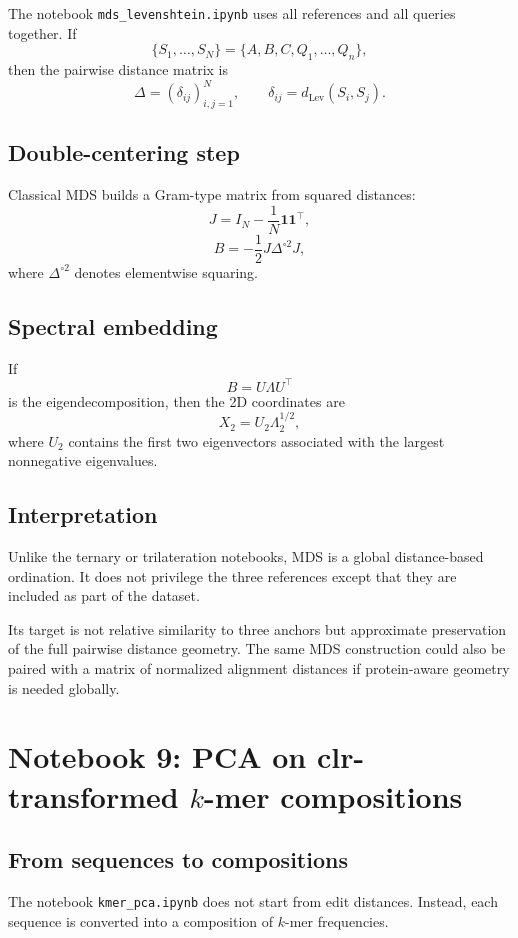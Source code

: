 \documentclass[11pt,a4paper]{article}
\begin{document}
The notebook \texttt{mds\_levenshtein.ipynb} uses all references and all queries together. If
\[
\{S_1,\dots,S_N\}=\{A,B,C,Q_1,\dots,Q_n\},
\]
then the pairwise distance matrix is
\[
\Delta=(\delta_{ij})_{i,j=1}^{N},
\qquad
\delta_{ij}=d_{\mathrm{Lev}}(S_i,S_j).
\]

\subsection{Double-centering step}

Classical MDS builds a Gram-type matrix from squared distances:
\[
J=I_N-\frac{1}{N}\bm{1}\bm{1}^\top,
\]
\[
B=-\frac12 J\Delta^{\circ 2}J,
\]
where $\Delta^{\circ 2}$ denotes elementwise squaring.

\subsection{Spectral embedding}

If
\[
B=U\Lambda U^\top
\]
is the eigendecomposition, then the 2D coordinates are
\[
X_2=U_2\Lambda_2^{1/2},
\]
where $U_2$ contains the first two eigenvectors associated with the largest nonnegative eigenvalues.

\subsection{Interpretation}

Unlike the ternary or trilateration notebooks, MDS is a global distance-based ordination. It does not privilege the three references except that they are included as part of the dataset.

Its target is not relative similarity to three anchors but approximate preservation of the full pairwise distance geometry. The same MDS construction could also be paired with a matrix of normalized alignment distances if protein-aware geometry is needed globally.

\section{Notebook 9: PCA on clr-transformed $k$-mer compositions}

\subsection{From sequences to compositions}

The notebook \texttt{kmer\_pca.ipynb} does not start from edit distances. Instead, each sequence is converted into a composition of $k$-mer frequencies.
\end{document}
